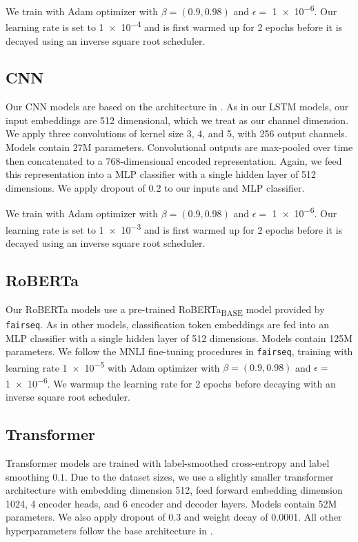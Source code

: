 We train with Adam optimizer \citep{kingma2014method} with $\beta = (0.9, 0.98)$ and $\epsilon =$ \num{1e-6}.
Our learning rate is set to \num{1e-4} and is first warmed up for 2 epochs before it is decayed using an inverse square root scheduler.

\subsection{CNN}
\label{subapp:cnn}
Our CNN models are based on the architecture in \cite{kim2014convolutional}. 
As in our LSTM models, our input embeddings are 512 dimensional, which we treat as our channel dimension.
We apply three convolutions of kernel size 3, 4, and 5, with 256 output channels. 
Models contain 27M parameters.
Convolutional outputs are max-pooled over time then concatenated to a 768-dimensional encoded representation.
Again, we feed this representation into a MLP classifier with a single hidden layer of 512 dimensions.
We apply dropout of 0.2 to our inputs and MLP classifier.

We train with Adam optimizer \citep{kingma2014method} with $\beta = (0.9, 0.98)$ and $\epsilon =$ \num{1e-6}.
Our learning rate is set to \num{1e-3} and is first warmed up for 2 epochs before it is decayed using an inverse square root scheduler.

\subsection{RoBERTa}
\label{subapp:roberta}
Our RoBERTa models use a pre-trained RoBERTa\textsubscript{BASE} model provided by \texttt{fairseq}. 
As in other models, classification token embeddings are fed into an MLP classifier with a single hidden layer of 512 dimensions.
Models contain 125M parameters.
We follow the MNLI fine-tuning procedures in \texttt{fairseq}, training with learning rate \num{1e-5} with Adam optimizer \citep{kingma2014method} with $\beta = (0.9, 0.98)$ and $\epsilon =$ \num{1e-6}.
We warmup the learning rate for 2 epochs before decaying with an inverse square root scheduler.

\subsection{Transformer}
\label{subapp:transformer}
Transformer models are trained with label-smoothed cross-entropy and label smoothing $0.1$. 
Due to the dataset sizes, we use a slightly smaller transformer architecture with embedding dimension 512, feed forward embedding dimension 1024, 4 encoder heads, and 6 encoder and decoder layers.
Models contain 52M parameters.
We also apply dropout of 0.3 and weight decay of 0.0001.
All other hyperparameters follow the base architecture in \citealt{vaswani2017attention}.

